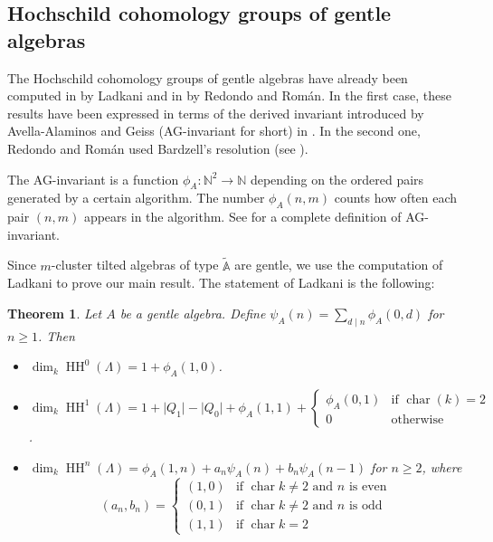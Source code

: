 \documentclass{amsart}
\theoremstyle{plain}
\newtheorem{teo}{Theorem}[section]
\theoremstyle{definition}
\begin{document}
\subsection{ Hochschild cohomology groups of gentle algebras}

The Hochschild cohomology groups of gentle algebras have already been computed in \cite{Lad12b} by Ladkani and in \cite{RR15} by Redondo and Rom\'an. In the
first case,  these results have been expressed in terms of the derived invariant introduced by Avella-Alaminos and Geiss (AG-invariant for short) in \cite{AG08}. In the second one, Redondo and Rom\'an used Bardzell's resolution (see \cite{Ba97}).

The AG-invariant is a function $\phi_{A}:\mathbb N^2\rightarrow \mathbb N$ depending on the ordered pairs generated by a certain algorithm. The
number $\phi_{A}(n,m)$ counts how often each pair $(n,m)$ appears in the algorithm.  See \cite{AG08} for a complete definition of AG-invariant.

Since $m$-cluster tilted algebras of type $\tilde{\mathbb{A}}$  are gentle, we use the computation of Ladkani to prove our main result. The statement of Ladkani is the following:

\begin{teo}\cite[Corollary 1]{Lad12b}\label{TeoLad} Let $A$ be a gentle algebra. Define $\psi_A(n)=\sum_{d\mid n} \phi_A(0,d)$ for $n\geq 1$. Then
\begin{itemize}
\item[(a)] ${\operatorname{dim}_k\operatorname{HH}^{{0}}(\Lambda)}=1+ \phi_A(1,0)$.
\item[(b)] ${\operatorname{dim}_k\operatorname{HH}^{{1}}(\Lambda)}=1+{\lvert {Q_1}\rvert}-{\lvert {Q_0}\rvert}+\phi_A(1,1)+ \begin{cases} \phi_A(0,1) & \mbox{if }
\operatorname{char}(k)=2\\ 0& \mbox{otherwise} \end{cases}$.
\item[(c)] ${\operatorname{dim}_k\operatorname{HH}^{{n}}(\Lambda)}=\phi_A(1,n)+a_n\psi_A(n)+b_n\psi_A(n-1)$ for $n\geq 2$, where $$(a_n,b_n)=
\begin{cases} (1,0)& \mbox{if } \operatorname{char}k\neq 2 \mbox{ and $n$ is even}\\ (0,1)&\mbox{if } \operatorname{char}k\neq 2 \mbox{ and $n$ is odd}\\
(1,1)&\mbox{if } \operatorname{char}k=2 \end{cases} $$
\end{itemize}

\end{teo}
\end{document}
